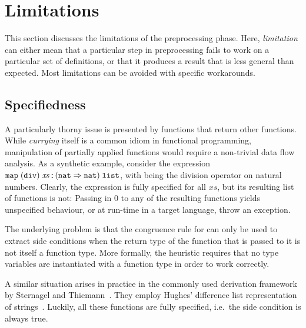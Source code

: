 
\section{Limitations}
\label{sec:preproc:limitations}

This section discusses the limitations of the preprocessing phase.
Here, \emph{limitation} can either mean that a particular step in preprocessing fails to work on a particular set of definitions, or that it produces a result that is less general than expected.
Most limitations can be avoided with specific workarounds.

\subsection{Specifiedness}

A particularly thorny issue is presented by functions that return other functions.
While \emph{currying} itself is a common idiom in functional programming, manipulation of partially applied functions would require a non-trivial data flow analysis.
As a synthetic example, consider the expression $\texttt{\textup{map}}\;(\texttt{\textup{div}})\;\mathit{xs} \mathbin{:\!\!:} (\texttt{\textup{nat}} \Rightarrow \texttt{\textup{nat}})\;\texttt{\textup{list}}$, with  being the division operator on natural numbers.
Clearly, the expression is fully specified for all $\mathit{xs}$, but its resulting list of functions is not:
Passing in $0$ to any of the resulting functions yields unspecified behaviour, or at run-time in a target language, throw an exception.

The underlying problem is that the congruence rule for  can only be used to extract side conditions when the return type of the function that is passed to it is not itself a function type.
More formally, the heuristic requires that no type variables are instantiated with a function type in order to work correctly.

A similar situation arises in practice in the commonly used  derivation framework by Sternagel and Thiemann~\cite{sternagel2014show}.
They employ Hughes' difference list representation of strings~\cite{hughes1986dlist}.
Luckily, all these functions are fully specified, i.e.\ the side condition is always true.

